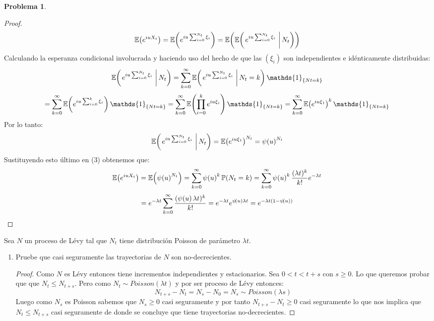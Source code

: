 \documentclass[a5paper,oneside]{amsart}
\theoremstyle{plain}
\theoremstyle{definition}
\newtheorem{problema}{Problema}
\begin{document}
\begin{problema}
\begin{proof}
\begin{equation}
\esp{e^{iu X_t}}=\esp{e^{iu \sum_{i=0}^{N_t}\xi_i}}=\esp{\espc{e^{iu \sum_{i=0}^{N_t}\xi_i}}{N_t}}
\end{equation}
Calculando la esperanza condicional  involucrada y haciendo uso del hecho de que las $(\xi_i)$ son independientes e id\'enticamente distribuidas:
$$
\espc{e^{iu \sum_{i=0}^{N_t}\xi_i}}{N_t}=\sum_{k=0}^{\infty}\espc{e^{iu \sum_{i=0}^{N_t}\xi_i}}{N_t=k}\mathds{1}_{\set{Nt=k}}
$$
$$
=\sum_{k=0}^{\infty}\esp{e^{iu \sum_{i=0}^{k}\xi_i}}\mathds{1}_{\set{Nt=k}}=\sum_{k=0}^{\infty}\esp{\prod_{i=0}^ke^{iu \xi_i}}\mathds{1}_{\set{Nt=k}}=\sum_{k=0}^{\infty}\esp{e^{iu \xi_1}}^k\mathds{1}_{\set{Nt=k}}
$$
Por lo tanto:
$$
\espc{e^{iu \sum_{i=0}^{N_t}\xi_i}}{N_t}=\esp{e^{iu \xi_1}}^{N_t}=\imf{\psi}{u}^{N_t}
$$
Sustituyendo esto \'ultimo en (3) obtenemos que:
$$
\mathbb{E}\! \left( e^{iu X_t} \right)=\mathbb{E}\! \left( \psi\!\left( u\right) ^{N_t} \right)=\sum_{k=0}^{\infty}\psi\!\left( u\right) ^k \mathbb{P} (N_t=k)=\sum_{k=0}^{\infty}\psi\!\left( u\right) ^k\frac{(\lambda t)^{k}}{k!}e^{-\lambda t}
$$
$$
=e^{-\lambda t}\sum_{k=0}^{\infty}\frac{(\psi\!\left( u\right)  \lambda t)^{k}}{k!}=e^{-\lambda t}e^{\psi\!\left( u\right)  \lambda t}=e^{-\lambda t\left( 1-\psi\!\left( u\right) \right) }
$$
\end{proof}
Sea $N$ un proceso de L\'evy tal que $N_t$ tiene distribuci\'on  Poisson de par\'ametro $\lambda t$. 
\begin{enumerate}
\item Pruebe que casi seguramente las trayectorias de $N$ son no-decrecientes.
\begin{proof}
Como $N$ es L\'evy entonces tiene incrementos independientes y estacionarios. Sea $0 <t < t+s$ con $s\geq 0$. Lo que queremos probar que  que $N_t \leq N_{t+s}$. Pero como $N_t \sim Poisson(\lambda t)$ y  por ser proceso de L\'evy entonces:
$$
N_{t+s}-N_t=N_{s}-N_0=N_{s} \sim Poisson(\lambda s)
$$
Luego como $N_{s}$ es Poisson sabemos que $N_s\geq0$ casi seguramente y por tanto $N_{t+s}-N_t\geq 0$ casi seguramente lo que nos implica que $N_t \leq N_{t+s}$ casi seguramente de donde se concluye que tiene trayectorias no-decrecientes.
\end{proof} 



\end{enumerate}
\end{problema}
\end{document}
